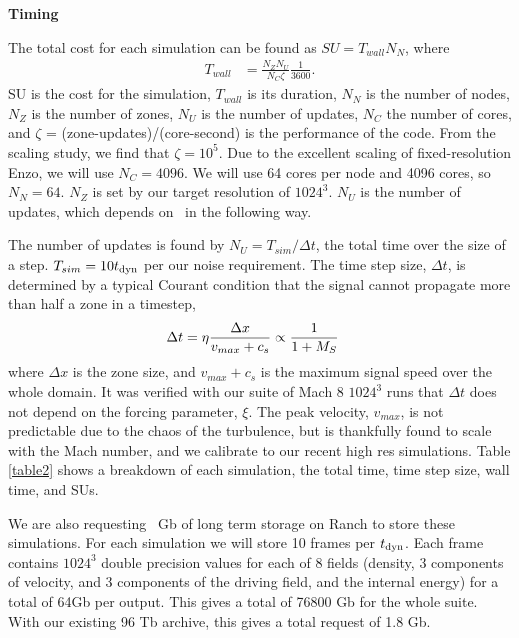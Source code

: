 \begin{Large}
\noindent\textbf{Timing}
\end{Large}


The total cost for each simulation can be found as 
$SU = T_{wall} N_N$, where
\begin{align}
T_{wall} &= \frac{N_Z N_U}{N_C \zeta} \frac{1}{3600}.
\end{align}
SU is the cost for the simulation, $T_{wall}$ is its duration, $N_N$ is the number of nodes, $N_Z$ is the number of zones, $N_U$ is the number of updates, $N_C$ the
number of cores, and $\zeta$ = (zone-updates)/(core-second) is the performance of
the code.  
From the scaling
study, we find that $\zeta=10^5$.  
Due to the excellent scaling of
fixed-resolution Enzo, we will use $N_C=4096$.
We will use 64 cores per node and 4096
cores, so $N_N=64$.
$N_Z$ is set by our target resolution of $1024^3$.  
$N_U$ is the number of updates,
which depends on \Mach\ in the following way.

The number of updates is found by $N_U=T_{sim}/\Delta t$, the total time over
the size of a step.  $T_{sim}=10t_{\rm{dyn}}$ per
our noise requirement.  The time step size, $\Delta t$, is determined by a
typical Courant condition that the signal cannot propagate more than half a zone
in a timestep,
\begin{align}
\Delta t &= \eta \frac{\Delta x}{v_{max}+ c_s} \propto \frac{1}{1+M_{S}}
\end{align}
where $\Delta x$ is the zone size, and $v_{max}+c_s$ is the maximum signal speed over
the whole domain.
It was verified with our suite of Mach 8 $1024^3$ runs that $\Delta t$ does not
depend on the forcing parameter, $\xi$.  
The peak velocity, $v_{max}$, is not predictable due to the chaos of the
turbulence, but is thankfully found to scale with the Mach number, and we
calibrate to our recent high res simulations.  Table \ref{table2} shows a
breakdown of each simulation, the total time, time step size, wall time, and
SUs.

We are also requesting \requestdisk\ Gb of long term storage on Ranch to store
these simulations.  For each simulation we will store 10 frames per $t_{\rm{dyn}}$.
Each frame contains $1024^3$ double precision values for each of 8 fields
(density, 3 components of velocity, and 3 components of the driving field, and
the internal energy) for a total of 64Gb per output.  This gives a total of
76800 Gb for the whole suite.  With our existing 96 Tb archive, this gives a
total request of 1.8 Gb.


